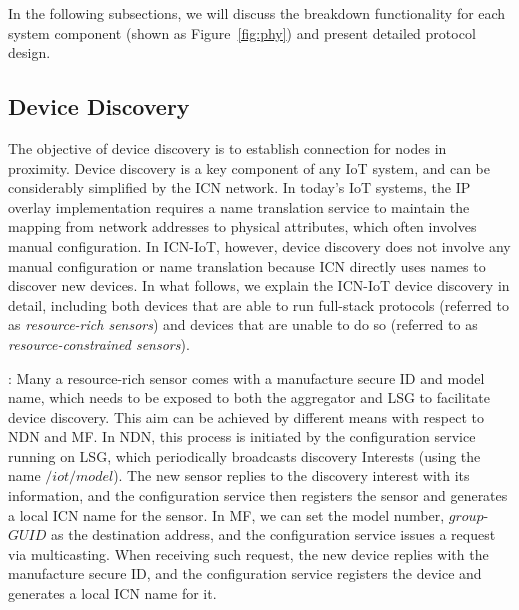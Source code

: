In the following subsections, we will discuss the breakdown functionality for each system component (shown as Figure~\ref{fig:phy}) and present detailed protocol design.

\subsection{Device Discovery}
The objective of device discovery is to establish connection for nodes in proximity. Device discovery is a key component of any IoT system, and can be considerably simplified by the ICN network. In today's IoT systems, the IP overlay implementation requires a name translation service to maintain the mapping from network addresses to physical attributes, which often involves manual configuration. In ICN-IoT, however, device discovery does not involve any manual configuration or name translation because ICN directly uses names to discover new devices. In what follows, we explain the ICN-IoT device discovery  in detail, including both devices that are able to run  full-stack protocols (referred to as \emph{resource-rich sensors}) and devices that are unable to do so (referred to as \emph{resource-constrained sensors}).

\vspace{1mm}: Many a resource-rich sensor comes with a manufacture secure ID and model name, which needs to be exposed to both the aggregator and LSG to facilitate device discovery. This aim can be achieved by different means with respect to NDN and MF.  In NDN, this process is initiated by the configuration service running on LSG, which periodically broadcasts discovery Interests (using the name $/iot/model$). The new sensor replies to the discovery interest with its information, and the configuration service then registers the sensor and generates a local ICN name for the sensor. In MF, we can set the model number, $group$-$GUID$ as the destination address, and the configuration service issues a request via multicasting. When receiving such request, the new device replies with the manufacture secure ID, and the configuration service registers the device and  generates a local ICN name for it.


